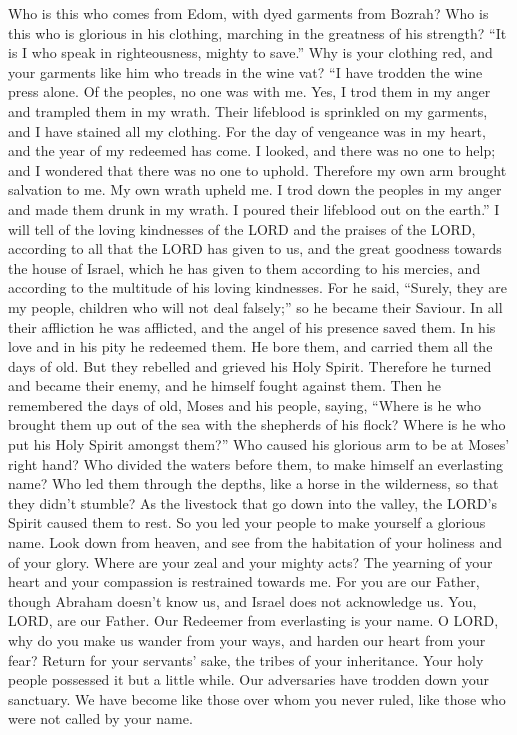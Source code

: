  Who is this who comes from Edom, with dyed garments from
Bozrah? Who is this who is glorious in his clothing, marching in the
greatness of his strength? ``It is I who speak in righteousness, mighty
to save.''  Why is your clothing red, and your garments like
him who treads in the wine vat?  ``I have trodden the wine
press alone. Of the peoples, no one was with me. Yes, I trod them in my
anger and trampled them in my wrath. Their lifeblood is sprinkled on my
garments, and I have stained all my clothing.  For the day
of vengeance was in my heart, and the year of my redeemed has come.
 I looked, and there was no one to help; and I wondered that
there was no one to uphold. Therefore my own arm brought salvation to
me. My own wrath upheld me.  I trod down the peoples in my
anger and made them drunk in my wrath. I poured their lifeblood out on
the earth.''  I will tell of the loving kindnesses of the
LORD and the praises of the LORD, according to all that the LORD has
given to us, and the great goodness towards the house of Israel, which
he has given to them according to his mercies, and according to the
multitude of his loving kindnesses.  For he said, ``Surely,
they are my people, children who will not deal falsely;'' so he became
their Saviour.  In all their affliction he was afflicted,
and the angel of his presence saved them. In his love and in his pity he
redeemed them. He bore them, and carried them all the days of old.
 But they rebelled and grieved his Holy Spirit. Therefore
he turned and became their enemy, and he himself fought against them.
 Then he remembered the days of old, Moses and his people,
saying, ``Where is he who brought them up out of the sea with the
shepherds of his flock? Where is he who put his Holy Spirit amongst
them?''  Who caused his glorious arm to be at Moses' right
hand? Who divided the waters before them, to make himself an everlasting
name?  Who led them through the depths, like a horse in the
wilderness, so that they didn't stumble?  As the livestock
that go down into the valley, the LORD's Spirit caused them to rest. So
you led your people to make yourself a glorious name.  Look
down from heaven, and see from the habitation of your holiness and of
your glory. Where are your zeal and your mighty acts? The yearning of
your heart and your compassion is restrained towards me. 
For you are our Father, though Abraham doesn't know us, and Israel does
not acknowledge us. You, LORD, are our Father. Our Redeemer from
everlasting is your name.  O LORD, why do you make us
wander from your ways, and harden our heart from your fear? Return for
your servants' sake, the tribes of your inheritance.  Your
holy people possessed it but a little while. Our adversaries have
trodden down your sanctuary.  We have become like those
over whom you never ruled, like those who were not called by your name.

